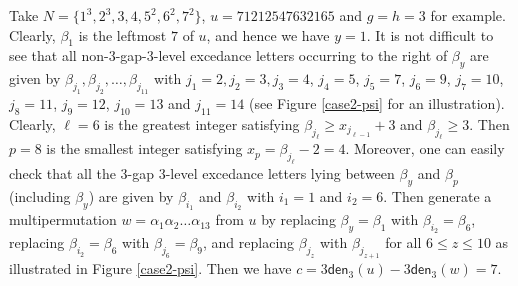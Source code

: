 \documentclass[12pt]{article}
\numberwithin{equation}{section}
\theoremstyle{plain}
\def\den{\mathsf{den}}
\begin{document}
 Take  $N=\{1^3, 2^3, 3, 4, 5^2, 6^2, 7^{2}\}$,    $u=71212547632165$ and $g=h=3$ for example. 
 Clearly, $\beta_1$ is the leftmost $7$ of $u$, and hence we have $y=1$. 
 It is not difficult to see that all  non-$3$-gap-$3$-level excedance letters occurring  to the right of $\beta_y$ are given by $\beta_{j_1}, \beta_{j_2},  \ldots, \beta_{j_{11}} $ with $j_1=2, j_2=3, j_3=4$,  $  j_4=5$, $j_5=7$, $j_6=9$,  $j_7=10$, $j_8=11$, $j_9=12$, $j_{10}=13$ and $j_{11}=14$ (see Figure \ref{case2-psi} for an illustration).  Clearly,  $\ell=6$ is the greatest integer satisfying  $\beta_{j_\ell}\geq x_{j_{\ell-1}}+3$ and $\beta_{j_\ell}\geq 3$. 
 Then   	 $p=8$ is the smallest  integer satisfying $x_p=\beta_{j_{\ell}}-2=4$. 
 Moreover, one can easily check that all the $3$-gap $3$-level excedance letters lying between $\beta_{y}$ and $\beta_{p}$ (including $\beta_y$) are given by $\beta_{i_1}$ and  $ \beta_{i_2}$  with  $i_1=1$ and $i_2=6$.    
Then generate a multipermutation $w=\alpha_1\alpha_2\ldots \alpha_{13}$  from $u$  by replacing $\beta_y=\beta_1$ with $\beta_{i_2}=\beta_{6}$, replacing $\beta_{i_2}=\beta_{6}$ with $\beta_{j_6}=\beta_{9}$,   and replacing $\beta_{j_z}$ with $\beta_{j_{z+1}}$ for all $6\leq z\leq 10$ as illustrated in Figure \ref{case2-psi}. 
Then we have $c=3\den_3(u)-3\den_3(w)=7$. 
\end{document}
